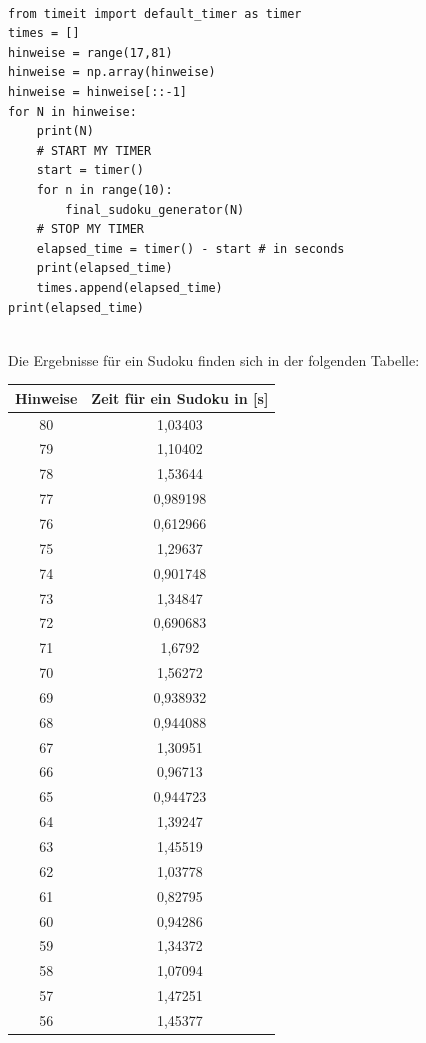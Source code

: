 \documentclass[11pt,a4paper]{article}
\begin{document}
\ \\
\begin{verbatim}
from timeit import default_timer as timer
times = []
hinweise = range(17,81)
hinweise = np.array(hinweise)
hinweise = hinweise[::-1]
for N in hinweise:
    print(N)
    # START MY TIMER
    start = timer()
    for n in range(10):
        final_sudoku_generator(N)
    # STOP MY TIMER
    elapsed_time = timer() - start # in seconds
    print(elapsed_time)
    times.append(elapsed_time)
print(elapsed_time)
\end{verbatim}
\ \\
Die Ergebnisse für ein Sudoku finden sich in der folgenden Tabelle:
\newpage
\begin{table}[htbp!]
\scriptsize
\begin{center} 
\begin{tabular}{|*{2}{c|}}
\hline 
Hinweise & Zeit für ein Sudoku in [s]\\ \hline 
80 & 1,03403 \\ \hline 
 79 & 1,10402 \\ \hline 
 78 & 1,53644 \\ \hline 
 77 & 0,989198 \\ \hline 
 76 & 0,612966 \\ \hline 
 75 & 1,29637 \\ \hline 
 74 & 0,901748 \\ \hline 
 73 & 1,34847 \\ \hline 
 72 & 0,690683 \\ \hline 
 71 & 1,6792 \\ \hline 
 70 & 1,56272 \\ \hline 
 69 & 0,938932 \\ \hline 
 68 & 0,944088 \\ \hline 
 67 & 1,30951 \\ \hline 
 66 & 0,96713 \\ \hline 
 65 & 0,944723 \\ \hline 
 64 & 1,39247 \\ \hline 
 63 & 1,45519 \\ \hline 
 62 & 1,03778 \\ \hline 
 61 & 0,82795 \\ \hline 
 60 & 0,94286 \\ \hline 
 59 & 1,34372 \\ \hline 
 58 & 1,07094 \\ \hline 
 57 & 1,47251 \\ \hline 
 56 & 1,45377 \\ \hline 

\end{tabular}
\end{center}
\end{table}
\end{document}
